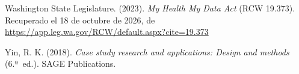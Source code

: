 \documentclass[12pt, a4paper]{article}
\begin{document}
\begin{list}{}{\setlength{\leftmargin}{1.27cm}\setlength{\itemindent}{-1.27cm}%
  \setlength{\labelwidth}{0pt}\setlength{\labelsep}{0pt}\setlength{\itemsep}{6pt}}
 
 
\item Washington State Legislature. (2023). \textit{My Health My
  Data Act} (RCW 19.373).
  Recuperado el 18 de octubre de 2026, de \url{https://app.leg.wa.gov/RCW/default.aspx?cite=19.373}




\item Yin, R. K. (2018). \textit{Case study research and
  applications: Design and methods} (6.ª~ed.). SAGE Publications.


\end{list}

%
%
%
%
%
\appendix
\end{document}
